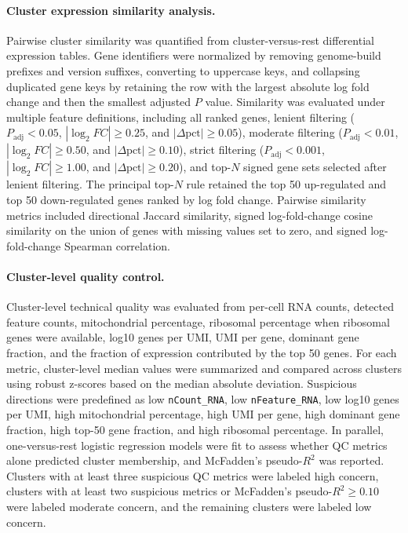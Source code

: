 \documentclass[11pt]{article}
\begin{document}
\paragraph{Cluster expression similarity analysis.}
Pairwise cluster similarity was quantified from cluster-versus-rest differential expression tables. Gene identifiers were normalized by removing genome-build prefixes and version suffixes, converting to uppercase keys, and collapsing duplicated gene keys by retaining the row with the largest absolute log fold change and then the smallest adjusted \(P\) value. Similarity was evaluated under multiple feature definitions, including all ranked genes, lenient filtering (\(P_{\mathrm{adj}} < 0.05\), \(|\log_2FC| \geq 0.25\), and \(|\Delta \mathrm{pct}| \geq 0.05\)), moderate filtering (\(P_{\mathrm{adj}} < 0.01\), \(|\log_2FC| \geq 0.50\), and \(|\Delta \mathrm{pct}| \geq 0.10\)), strict filtering (\(P_{\mathrm{adj}} < 0.001\), \(|\log_2FC| \geq 1.00\), and \(|\Delta \mathrm{pct}| \geq 0.20\)), and top-\(N\) signed gene sets selected after lenient filtering. The principal top-\(N\) rule retained the top 50 up-regulated and top 50 down-regulated genes ranked by log fold change. Pairwise similarity metrics included directional Jaccard similarity, signed log-fold-change cosine similarity on the union of genes with missing values set to zero, and signed log-fold-change Spearman correlation.

\paragraph{Cluster-level quality control.}
Cluster-level technical quality was evaluated from per-cell RNA counts, detected feature counts, mitochondrial percentage, ribosomal percentage when ribosomal genes were available, log10 genes per UMI, UMI per gene, dominant gene fraction, and the fraction of expression contributed by the top 50 genes. For each metric, cluster-level median values were summarized and compared across clusters using robust z-scores based on the median absolute deviation. Suspicious directions were predefined as low \texttt{nCount\_RNA}, low \texttt{nFeature\_RNA}, low log10 genes per UMI, high mitochondrial percentage, high UMI per gene, high dominant gene fraction, high top-50 gene fraction, and high ribosomal percentage. In parallel, one-versus-rest logistic regression models were fit to assess whether QC metrics alone predicted cluster membership, and McFadden's pseudo-\(R^2\) was reported. Clusters with at least three suspicious QC metrics were labeled high concern, clusters with at least two suspicious metrics or McFadden's pseudo-\(R^2 \geq 0.10\) were labeled moderate concern, and the remaining clusters were labeled low concern.
\end{document}
